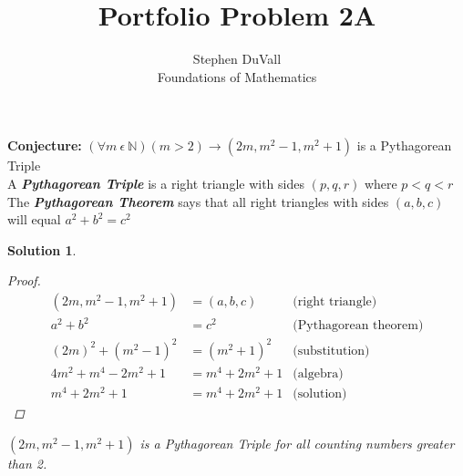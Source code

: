 \documentclass[12pt]{article}
\theoremstyle{mysolutionstyle}
\newtheorem*{soln}{Solution}
\begin{document}
\title{Portfolio Problem 2A}%
\author{Stephen DuVall \\ %
Foundations of Mathematics} %

\maketitle
\textbf{Conjecture:} $(\forall m\ \epsilon\ \mathbb{N})(m > 2) \rightarrow (2m, m^2-1, m^2+1)$ is a Pythagorean Triple\\
\hfill
A \textbf{\emph{Pythagorean Triple}} is a right triangle with sides $(p, q, r)$ where $p < q < r$\\
The \textbf{\emph{Pythagorean Theorem}} says that all right triangles with sides $(a, b, c)$ will equal $a^2 + b^2 = c^2$
\hfill
\begin{soln} 
\hfill
\begin{proof}
\begin{align*}
	(2m, m^2-1, m^2+1) &= (a, b, c)  &\text{(right triangle)}\\
	a^2 + b^2 &= c^2  &\text{(Pythagorean theorem)}\\
	(2m)^2 + (m^2 - 1)^2 &= (m^2 + 1)^2 &\text{(substitution)}\\
	4m^2 + m^4 - 2m^2 + 1 &= m^4 + 2m^2 + 1  &\text{(algebra)}\\
	m^4 + 2m^2 + 1 &= m^4 + 2m^2 + 1 &\text{(solution)}
\end{align*}
\end{proof}
$(2m, m^2 - 1, m^2 + 1)$ is a Pythagorean Triple for all counting numbers greater than 2.
\end{soln}
\end{document}

